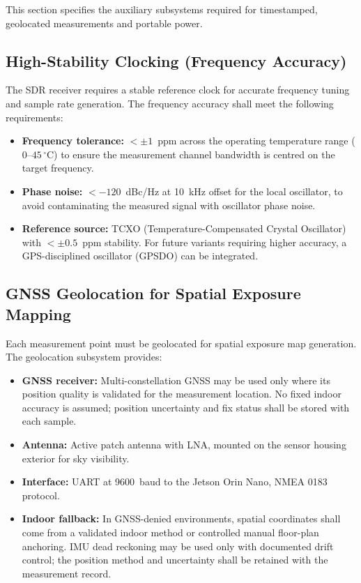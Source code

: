 \documentclass[11pt,a4paper]{article}
\begin{document}
This section specifies the auxiliary subsystems required for timestamped, geolocated measurements and portable power.

\subsection{High-Stability Clocking (Frequency Accuracy)}

The SDR receiver requires a stable reference clock for accurate frequency tuning and sample rate generation. The frequency accuracy shall meet the following requirements:

\begin{itemize}
    \item \textbf{Frequency tolerance:} $< \pm 1$~ppm across the operating temperature range ($0$--$45\,^{\circ}$C) to ensure the measurement channel bandwidth is centred on the target frequency.
    \item \textbf{Phase noise:} $< -120$~dBc/Hz at 10~kHz offset for the local oscillator, to avoid contaminating the measured signal with oscillator phase noise.
    \item \textbf{Reference source:} TCXO (Temperature-Compensated Crystal Oscillator) with $< \pm 0.5$~ppm stability. For future variants requiring higher accuracy, a GPS-disciplined oscillator (GPSDO) can be integrated.
\end{itemize}

\subsection{GNSS Geolocation for Spatial Exposure Mapping}

Each measurement point must be geolocated for spatial exposure map generation. The geolocation subsystem provides:

\begin{itemize}
    \item \textbf{GNSS receiver:} Multi-constellation GNSS may be used only where its position quality is validated for the measurement location. No fixed indoor accuracy is assumed; position uncertainty and fix status shall be stored with each sample.
    \item \textbf{Antenna:} Active patch antenna with LNA, mounted on the sensor housing exterior for sky visibility.
    \item \textbf{Interface:} UART at 9600~baud to the Jetson Orin Nano, NMEA 0183 protocol.
    \item \textbf{Indoor fallback:} In GNSS-denied environments, spatial coordinates shall come from a validated indoor method or controlled manual floor-plan anchoring. IMU dead reckoning may be used only with documented drift control; the position method and uncertainty shall be retained with the measurement record.
\end{itemize}
\end{document}
